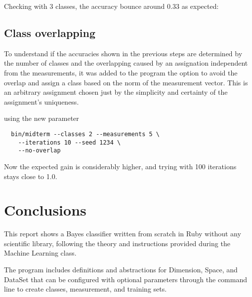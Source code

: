 \documentclass[letterpaper, conference]{IEEEtran}
\begin{document}
\begin{figure}[hbt]
  \label{fig:100-training-2-classes-uniform}
  \caption{}
\end{figure}

Checking with 3 classes, the accuracy bounce around $0.33$ as expected:

\begin{figure}[hbt]
  \label{fig:10-training-3-classes-uniform}
  \caption{}
\end{figure}

\subsection{Class overlapping}

To understand if the accuracies shown in the previous steps are determined by the number of classes and the overlapping caused by an assignation independent from the measurements, it was added to the program the option to avoid the overlap and assign a class based on the norm of the measurement vector. This is an arbitrary assignment chosen just by the simplicity and certainty of the assignment's uniqueness.

using the new parameter

\begin{verbatim}
  bin/midterm --classes 2 --measurements 5 \
    --iterations 10 --seed 1234 \
    --no-overlap
\end{verbatim}

\begin{figure}[hbt]
  \label{fig:10-training-2-classes-no-overlapping}
  \caption{}
\end{figure}

Now the expected gain is considerably higher, and trying with 100 iterations stays close to 1.0.

\begin{figure}[hbt]
  \label{fig:100-training-2-classes-no-overlapping}
  \caption{}
\end{figure}

\section{Conclusions}

This report shows a Bayes classifier written from scratch in Ruby without any scientific library, following the theory and instructions provided during the Machine Learning class.

The program includes definitions and abstractions for Dimension, Space, and DataSet that can be configured with optional parameters through the command line to create classes, measurement, and training sets.
\end{document}
